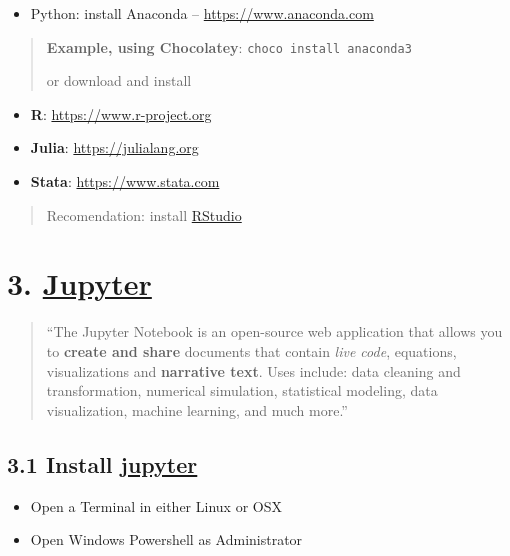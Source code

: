 \documentclass[
  12pt,
]{article}
\providecommand{\tightlist}{%
  \setlength{\itemsep}{0pt}\setlength{\parskip}{0pt}}
\begin{document}
\begin{itemize}
\tightlist
\item
  Python: install Anaconda --
  \href{https://www.anaconda.com/}{https://www.anaconda.com}
\end{itemize}

\begin{quote}
\textbf{Example, using Chocolatey}: \texttt{choco\ install\ anaconda3}

or download and install
\end{quote}

\begin{itemize}
\tightlist
\item
  \textbf{R}:
  \href{https://www.r-project.org/}{https://www.r-project.org}
\item
  \textbf{Julia}: \href{https://julialang.org/}{https://julialang.org}
\item
  \textbf{Stata}: \href{https://www.stata.com/}{https://www.stata.com}
\end{itemize}

\begin{quote}
Recomendation: install
\href{https://rstudio.com/products/rstudio/download/}{RStudio}
\end{quote}

\hypertarget{jupyter}{%
\section{\texorpdfstring{3.
\href{https://jupyter.org/}{Jupyter}}{3. Jupyter}}\label{jupyter}}

\begin{quote}
``The Jupyter Notebook is an open-source web application that allows you
to \textbf{create and share} documents that contain \emph{live code},
equations, visualizations and \textbf{narrative text}. Uses include:
data cleaning and transformation, numerical simulation, statistical
modeling, data visualization, machine learning, and much more.''
\end{quote}

\hypertarget{install-jupyter}{%
\subsection{\texorpdfstring{3.1 Install
\href{https://jupyter.org/install}{jupyter}}{3.1 Install jupyter}}\label{install-jupyter}}

\begin{itemize}
\tightlist
\item
  Open a Terminal in either Linux or OSX
\item
  Open Windows Powershell as Administrator
\end{itemize}
\end{document}
